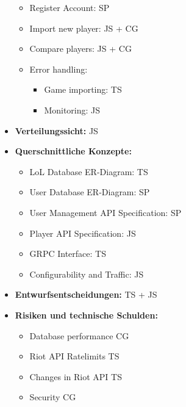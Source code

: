 \begin{itemize}
\begin{itemize}
	\item
	Register Account: SP
	\item
	Import new player: JS + CG
	\item
	Compare players: JS + CG
	\item
	Error handling:
	\begin{itemize}
		\item
		Game importing: TS
		\item
		Monitoring: JS
	\end{itemize}
\end{itemize}
\item
\textbf{Verteilungssicht:} JS
\item
\textbf{Querschnittliche Konzepte:}
\begin{itemize}
	\item
	LoL Database ER-Diagram: TS
	\item
	User Database ER-Diagram: SP
	\item
	User Management API Specification: SP
	\item
	Player API Specification: JS
	\item
	GRPC Interface: TS
	\item
	Configurability and Traffic: JS
\end{itemize}
\item
\textbf{Entwurfsentscheidungen:} TS + JS
\item
\textbf{Risiken und technische Schulden:}
\begin{itemize}
	\item
	Database performance CG
	\item
	Riot API Ratelimits TS
	\item
	Changes in Riot API TS
	\item
	Security CG
\end{itemize}
\end{itemize}